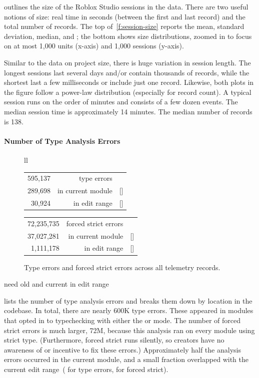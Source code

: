 \documentclass[english,submission,cleveref]{programming}
\begin{document}
 outlines the size of the Roblox Studio sessions in the
data.
There are two useful notions of size: real time in seconds (between the first
and last record) and the total number of records.
The top of~\cref{f:session-size} reports the mean, standard deviation,
median, and ; the bottom shows size distributions, zoomed in
to focus on at most 1,000 units (x-axis) and 1,000 sessions
(y-axis).

Similar to the data on project size, there is huge variation in session
length.
The longest sessions last several days and/or contain thousands of records,
while the shortest last a few milliseconds or include just one record.
Likewise, both plots in the figure follow a power-law distribution
(especially for record count).
A typical session runs on the order of minutes and consists of a few dozen events.
The median session time is approximately 14 minutes.
The median number of
records is 138.


\paragraph{Number of Type Analysis Errors}

\begin{figure}[t]
  \begin{tabular}[t]{ll} \\
    \begin{tabular}[t]{r@{~~}r@{~}l}
      595,137 & type errors \\
      289,698 & in current module & [\pct{48.68}] \\
       30,924 & in edit range & [\pct{5.20}]
    \end{tabular}
    \begin{tabular}[t]{r@{~~}r@{~}l}
      72,235,735 & {forced strict errors} \\
      37,027,281 & in current module & [\pct{51.26}] \\
       1,111,178 & in edit range & [\pct{1.54}]
    \end{tabular}
  \end{tabular}
  \caption{Type errors and forced strict errors across all telemetry records.}
  \label{f:count-analysis-errors}
\end{figure}

\FILL{} need old and current in edit range

 lists the number of type analysis errors
and breaks them down by location in the codebase.
In total, there are nearly 600K type errors.
These appeared in modules that opted in to typechecking with either the
\mnonstrict{} or \mstrict{} mode.
The number of forced strict errors is much larger, 72M, because this analysis
ran on every module using strict type.
(Furthermore, forced strict runs silently, so creators have no
awareness of or incentive to
fix these errors.)
Approximately half the analysis errors occurred in the current module,
and a small fraction overlapped with the current edit range~( for
type errors,  for forced strict).
\end{document}
